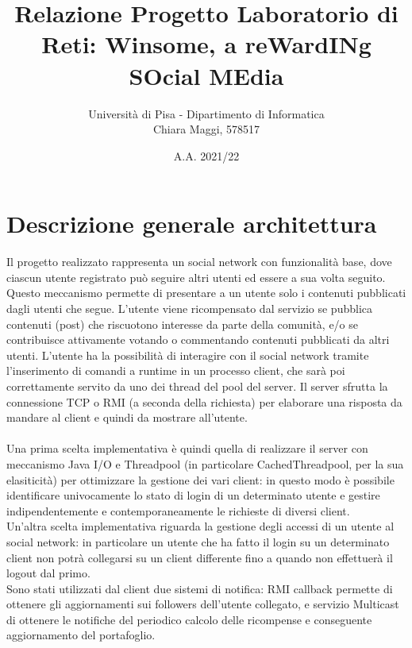 \documentclass[11pt, a4paper, oneside]{article}
\begin{document}
\title{Relazione Progetto Laboratorio di Reti: Winsome, a reWardINg SOcial MEdia}
\author{Università di Pisa - Dipartimento di Informatica \\ Chiara Maggi, 578517}
\date{A.A. 2021/22}
\maketitle
\tableofcontents

\section{Descrizione generale architettura}
Il progetto realizzato rappresenta un social network con funzionalità base, dove ciascun utente registrato può seguire altri utenti ed essere a sua volta seguito. 
Questo meccanismo permette di presentare a un utente solo i contenuti pubblicati dagli utenti che segue. L’utente viene ricompensato dal servizio se pubblica contenuti
(post) che riscuotono interesse da parte della comunità, e/o se contribuisce attivamente votando o commentando contenuti pubblicati da altri utenti.
L'utente ha la possibilità di interagire con il social network tramite l’inserimento di comandi a runtime in un processo client, che sarà poi correttamente servito da 
uno dei thread del pool del server. Il server sfrutta la connessione TCP o RMI (a seconda della richiesta) per elaborare una risposta da mandare al client e quindi da 
mostrare all'utente.\\ \\
Una prima scelta implementativa è quindi quella di realizzare il server con meccanismo Java I/O e Threadpool (in particolare CachedThreadpool, per la sua elasiticità) per ottimizzare la 
gestione dei vari client: in questo modo è possibile identificare univocamente lo stato di login di un determinato utente e gestire indipendentemente e 
contemporaneamente le richieste di diversi client.\\ 
Un'altra scelta implementativa riguarda la gestione degli accessi di un utente al social network: in particolare un utente che ha fatto il login su un determinato 
client non potrà collegarsi su un client differente fino a quando non effettuerà il logout dal primo.\\
Sono stati utilizzati dal client due sistemi di notifica: RMI callback permette di ottenere gli aggiornamenti sui followers dell'utente collegato, e servizio 
Multicast di ottenere le notifiche del periodico calcolo delle ricompense e conseguente aggiornamento del portafoglio. 
\end{document}
